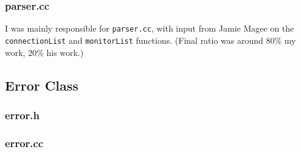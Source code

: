 \documentclass[a4paper,10pt]{article}
\begin{document}
\subsubsection{parser.cc}


I was mainly responsible for \texttt{parser.cc}, with input from Jamie Magee on the \texttt{connectionList} and \texttt{monitorList} functions. (Final ratio was around 80\% my work, 20\% his work.) 

\subsection{Error Class}
\subsubsection{error.h}

\subsubsection{error.cc}

\end{document}
